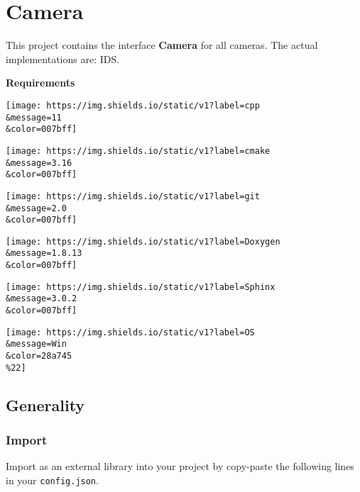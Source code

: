 \hypertarget{camera}{%
\section{Camera}\label{camera}}

This project contains the interface \textbf{Camera} for all cameras. The
actual implementations are: IDS.

\textbf{Requirements}

\texttt{[image: https://img.shields.io/static/v1?label=cpp\\\&message=11\\\&color=007bff]}

\texttt{[image: https://img.shields.io/static/v1?label=cmake\\\&message=3.16\\\&color=007bff]}

\texttt{[image: https://img.shields.io/static/v1?label=git\\\&message=2.0\\\&color=007bff]}

\texttt{[image: https://img.shields.io/static/v1?label=Doxygen\\\&message=1.8.13\\\&color=007bff]}

\texttt{[image: https://img.shields.io/static/v1?label=Sphinx\\\&message=3.0.2\\\&color=007bff]}

\texttt{[image: https://img.shields.io/static/v1?label=OS\\\&message=Win\\\&color=28a745\\\%22]}

\hypertarget{generality}{%
\subsection{Generality}\label{generality}}

\hypertarget{import}{%
\subsubsection{Import}\label{import}}

Import as an external library into your project by copy-paste the
following lines in your \texttt{config.json}.

\begin{Shaded}
\begin{Highlighting}[]
\FunctionTok{\{}
       \FunctionTok{:} \FunctionTok{,}
       \FunctionTok{:} \FunctionTok{,}
        \FunctionTok{:} \FunctionTok{,}
  \FunctionTok{:} \FunctionTok{,}
     \FunctionTok{:} 
\FunctionTok{\}}
\end{Highlighting}
\end{Shaded}

